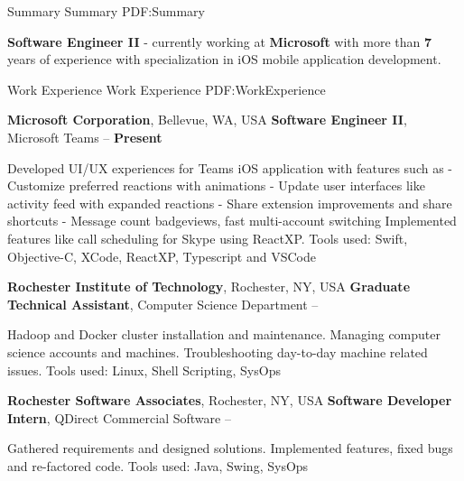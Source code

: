 \documentclass[letterpaper,MMMyyyy,nonstopmode]{simpleresumecv}
\begin{document}
\begin{Body}


\Section
{Summary}
{Summary}
{PDF:Summary}

\Entry
\textbf{Software Engineer II} - currently working at \textbf{Microsoft} with more than \textbf{7} years of experience with specialization in iOS mobile application development.

\BigGap
\BigGap


\Section
{Work Experience}
{Work Experience}
{PDF:WorkExperience}

\Entry
{\textbf{Microsoft Corporation}, \small{Bellevue, WA, USA}}
\Gap
\BulletItem
\textbf{Software Engineer II}, Microsoft Teams
\hfill
{} -- \textbf{Present}
\begin{Detail}
\SubBulletItem
Developed UI/UX experiences for Teams iOS application with features such as \newline
- Customize preferred reactions with animations \newline
- Update user interfaces like activity feed with expanded reactions \newline
- Share extension improvements and share shortcuts \newline
- Message count badgeviews, fast multi-account switching
\SubBulletItem
Implemented features like call scheduling for Skype using ReactXP.
\SubBulletItem
Tools used: Swift, Objective-C, XCode, ReactXP, Typescript and VSCode
\end{Detail}

\BigGap
\BigGap

\Entry
{\textbf{Rochester Institute of Technology}, \small{Rochester, NY, USA}}
\Gap
\BulletItem
\textbf{Graduate Technical Assistant}, Computer Science Department
\hfill
{} --
\begin{Detail}
\SubBulletItem
Hadoop and Docker cluster installation and maintenance.
\SubBulletItem
Managing computer science accounts and machines.
\SubBulletItem
Troubleshooting day-to-day machine related issues.
\SubBulletItem
Tools used: Linux, Shell Scripting, SysOps
\end{Detail}

\BigGap
\BigGap

\Entry
{\textbf{Rochester Software Associates}, \small{Rochester, NY, USA}}
\Gap
\BulletItem
\textbf{Software Developer Intern}, QDirect Commercial Software
\hfill
{} --
\begin{Detail}
\SubBulletItem
Gathered requirements and designed solutions.
\SubBulletItem
Implemented features, fixed bugs and re-factored code.
\SubBulletItem
Tools used: Java, Swing, SysOps
\end{Detail}



\end{Body}
\end{document}
